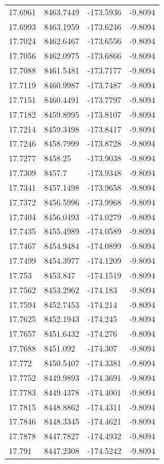 \begin{table}[H]
\begin{tabular}{llll}
17.6961 & 8463.7449 & -173.5936 & -9.8094 \\
17.6993 & 8463.1959 & -173.6246 & -9.8094 \\
17.7024 & 8462.6467 & -173.6556 & -9.8094 \\
17.7056 & 8462.0975 & -173.6866 & -9.8094 \\
17.7088 & 8461.5481 & -173.7177 & -9.8094 \\
17.7119 & 8460.9987 & -173.7487 & -9.8094 \\
17.7151 & 8460.4491 & -173.7797 & -9.8094 \\
17.7182 & 8459.8995 & -173.8107 & -9.8094 \\
17.7214 & 8459.3498 & -173.8417 & -9.8094 \\
17.7246 & 8458.7999 & -173.8728 & -9.8094 \\
17.7277 & 8458.25 & -173.9038 & -9.8094 \\
17.7309 & 8457.7 & -173.9348 & -9.8094 \\
17.7341 & 8457.1498 & -173.9658 & -9.8094 \\
17.7372 & 8456.5996 & -173.9968 & -9.8094 \\
17.7404 & 8456.0493 & -174.0279 & -9.8094 \\
17.7435 & 8455.4989 & -174.0589 & -9.8094 \\
17.7467 & 8454.9484 & -174.0899 & -9.8094 \\
17.7499 & 8454.3977 & -174.1209 & -9.8094 \\
17.753 & 8453.847 & -174.1519 & -9.8094 \\
17.7562 & 8453.2962 & -174.183 & -9.8094 \\
17.7594 & 8452.7453 & -174.214 & -9.8094 \\
17.7625 & 8452.1943 & -174.245 & -9.8094 \\
17.7657 & 8451.6432 & -174.276 & -9.8094 \\
17.7688 & 8451.092 & -174.307 & -9.8094 \\
17.772 & 8450.5407 & -174.3381 & -9.8094 \\
17.7752 & 8449.9893 & -174.3691 & -9.8094 \\
17.7783 & 8449.4378 & -174.4001 & -9.8094 \\
17.7815 & 8448.8862 & -174.4311 & -9.8094 \\
17.7846 & 8448.3345 & -174.4621 & -9.8094 \\
17.7878 & 8447.7827 & -174.4932 & -9.8094 \\
17.791 & 8447.2308 & -174.5242 & -9.8094 \\

\end{tabular}
\end{table}
